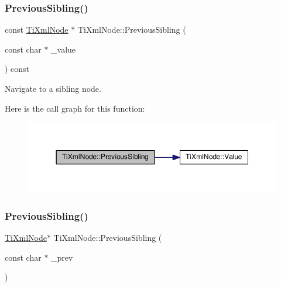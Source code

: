\subsubsection{\texorpdfstring{Previous\+Sibling()}{PreviousSibling()}\hspace{0.1cm}{\footnotesize\ttfamily [3/4]}}
{\footnotesize\ttfamily const \hyperlink{class_ti_xml_node}{Ti\+Xml\+Node} $\ast$ Ti\+Xml\+Node\+::\+Previous\+Sibling (\begin{DoxyParamCaption}\item[{const char $\ast$}]{\+\_\+value }\end{DoxyParamCaption}) const}



Navigate to a sibling node. 

Here is the call graph for this function\+:\nopagebreak
\begin{figure}[H]
\begin{center}
\leavevmode
\includegraphics[width=350pt]{class_ti_xml_node_ace1b618fe58b2b9305fe89bfbc8dd17b_cgraph}
\end{center}
\end{figure}
\mbox{\label{class_ti_xml_node_a6c977049207177ef21b51972315c2053}} 
\subsubsection{\texorpdfstring{Previous\+Sibling()}{PreviousSibling()}\hspace{0.1cm}{\footnotesize\ttfamily [4/4]}}
{\footnotesize\ttfamily \hyperlink{class_ti_xml_node}{Ti\+Xml\+Node}$\ast$ Ti\+Xml\+Node\+::\+Previous\+Sibling (\begin{DoxyParamCaption}\item[{const char $\ast$}]{\+\_\+prev }\end{DoxyParamCaption})\hspace{0.3cm}{\ttfamily [inline]}}

